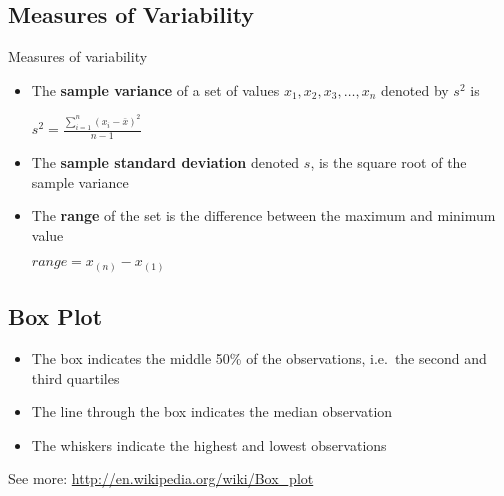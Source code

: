     \subsection{Measures of Variability}
      Measures of variability
      \begin{itemize}
        \item The \textbf{sample variance} of a set of values $x_1, x_2,
          x_3,\ldots, x_n$ denoted by $s^2$ is
          \begin{center}
            $s^2 = \frac{\sum_{i=1}^{n}{(x_i-\bar{x})}^2}{n-1}$
          \end{center}
        \item The \textbf{sample standard deviation} denoted $s$, is the square
          root of the sample variance
        \item The \textbf{range} of the set is the difference between the
          maximum and minimum value
          \begin{center}
            $range = x_{(n)} - x_{(1)}$
          \end{center}
      \end{itemize}

    \subsection{Box Plot}
      \begin{itemize}
        \item The box indicates the middle 50\% of the observations, i.e.\ the
          second and third quartiles
        \item The line through the box indicates the median observation
        \item The whiskers indicate the highest and lowest observations
      \end{itemize}
      See more: \url{http://en.wikipedia.org/wiki/Box_plot}
